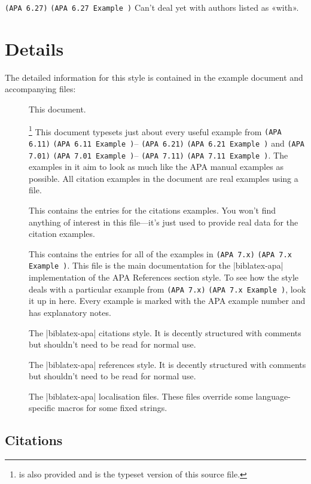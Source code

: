 \documentclass{ltxdockit}
\newcommand\apa[2][]{\ifthenelse{\equal{#1}{}}%
                       {\texttt{(APA #2)}}%
                       {\texttt{(APA #2 Example #1)}}}
\begin{document}
\begin{description}
\item\apa{6.27} Can't deal yet with authors listed as «with».
\end{description}

\section{Details}

The detailed information for this style is contained in the example document and
accompanying  files:
\begin{description}
\item[] This document.
\item[]\footnote{
    is also provided and is the typeset version of this \latex source
    file.} This document typesets just about every useful example from
  \apa{6.11}--\apa{6.21} and \apa{7.01}--\apa{7.11}. The examples in it
  aim to look as much like the APA manual examples as possible. All
  citation examples in the document are real examples using a 
  file.
\item[] This contains the 
  entries for the citations examples. You won't find anything of interest
  in this file---it's just used to provide real data for the citation
  examples.
\item[] This contains the
   entries for all of the examples in \apa{7.x}. This file is
  the main documentation for the |biblatex-apa| implementation of the APA
  References section style. To see how the style deals with a particular
  example from \apa{7.x}, look it up in here. Every example is marked with
  the APA example number and has explanatory notes.
\item[] The |biblatex-apa| citations style. It is
  decently structured with comments but shouldn't need to be read for
  normal use.
\item[] The |biblatex-apa| references style. It is
  decently structured with comments but shouldn't need to be read for
  normal use.
\item[] The |biblatex-apa| localisation files. These files
  override some language-specific macros for some fixed strings.
\end{description}

\subsection{Citations}
\end{document}
